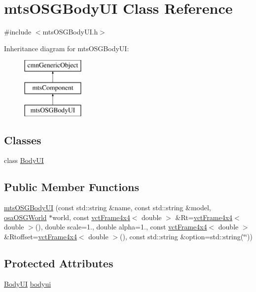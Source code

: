 \hypertarget{classmts_o_s_g_body_u_i}{\section{mts\-O\-S\-G\-Body\-U\-I Class Reference}
\label{classmts_o_s_g_body_u_i}
}


{\ttfamily \#include $<$mts\-O\-S\-G\-Body\-U\-I.\-h$>$}

Inheritance diagram for mts\-O\-S\-G\-Body\-U\-I\-:\begin{figure}[H]
\begin{center}
\leavevmode
\includegraphics[height=3.000000cm]{da/dd7/classmts_o_s_g_body_u_i}
\end{center}
\end{figure}
\subsection*{Classes}
\begin{DoxyCompactItemize}
\item 
class \hyperlink{classmts_o_s_g_body_u_i_1_1_body_u_i}{Body\-U\-I}
\end{DoxyCompactItemize}
\subsection*{Public Member Functions}
\begin{DoxyCompactItemize}
\item 
\hyperlink{classmts_o_s_g_body_u_i_a57e2b01d12c8f0b1ffc71f2fa01df0e9}{mts\-O\-S\-G\-Body\-U\-I} (const std\-::string \&name, const std\-::string \&model, \hyperlink{classosa_o_s_g_world}{osa\-O\-S\-G\-World} $\ast$world, const \hyperlink{classvct_frame4x4}{vct\-Frame4x4}$<$ double $>$ \&Rt=\hyperlink{classvct_frame4x4}{vct\-Frame4x4}$<$ double $>$(), double scale=1., double alpha=1., const \hyperlink{classvct_frame4x4}{vct\-Frame4x4}$<$ double $>$ \&Rtoffset=\hyperlink{classvct_frame4x4}{vct\-Frame4x4}$<$ double $>$(), const std\-::string \&option=std\-::string(\char`\"{}\char`\"{}))
\end{DoxyCompactItemize}
\subsection*{Protected Attributes}
\begin{DoxyCompactItemize}
\item 
\hyperlink{classmts_o_s_g_body_u_i_1_1_body_u_i}{Body\-U\-I} \hyperlink{classmts_o_s_g_body_u_i_ae0dac024a22c934f1dff1da02f83ae8a}{bodyui}
\end{DoxyCompactItemize}
